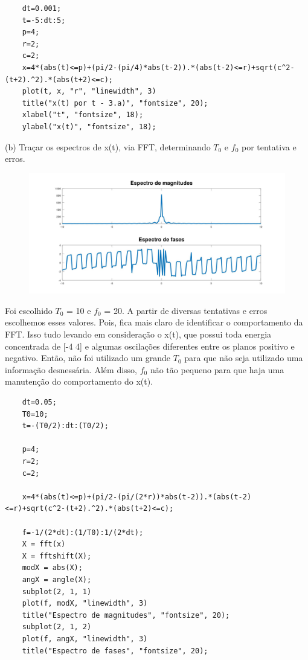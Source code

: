 \documentclass[10pt]{article}
\begin{document}
\begin{verbatim}
    dt=0.001;
    t=-5:dt:5;
    p=4;
    r=2;
    c=2;
    x=4*(abs(t)<=p)+(pi/2-(pi/4)*abs(t-2)).*(abs(t-2)<=r)+sqrt(c^2-(t+2).^2).*(abs(t+2)<=c);
    plot(t, x, "r", "linewidth", 3)
    title("x(t) por t - 3.a)", "fontsize", 20);
    xlabel("t", "fontsize", 18);
    ylabel("x(t)", "fontsize", 18);
\end{verbatim}

(b) Traçar os espectros de x(t), via FFT, determinando $T_0$ e $f_0$ por tentativa e erros.

\begin{figure}[h]
    \includegraphics[scale=0.25]{questao3b}
    \centering
\end{figure}

Foi escolhido $T_0$ = 10 e $f_0$ = 20. A partir de diversas tentativas e erros escolhemos esses valores. Pois, fica mais claro de identificar o comportamento da FFT. Isso tudo levando em consideração o x(t), que possui toda energia concentrada de [-4 4] e algumas oscilações diferentes entre os planos positivo e negativo. Então, não foi utilizado um grande $T_0$ para que não seja utilizado uma informação desnessária. Além disso, $f_0$ não tão pequeno para que haja uma manutenção do comportamento do x(t).

\begin{verbatim}
    dt=0.05;
    T0=10;
    t=-(T0/2):dt:(T0/2);

    p=4;
    r=2;
    c=2;

    x=4*(abs(t)<=p)+(pi/2-(pi/(2*r))*abs(t-2)).*(abs(t-2)<=r)+sqrt(c^2-(t+2).^2).*(abs(t+2)<=c);

    f=-1/(2*dt):(1/T0):1/(2*dt);
    X = fft(x)
    X = fftshift(X);
    modX = abs(X);
    angX = angle(X);
    subplot(2, 1, 1)
    plot(f, modX, "linewidth", 3)
    title("Espectro de magnitudes", "fontsize", 20);
    subplot(2, 1, 2)
    plot(f, angX, "linewidth", 3)
    title("Espectro de fases", "fontsize", 20);
\end{verbatim}
\end{document}
